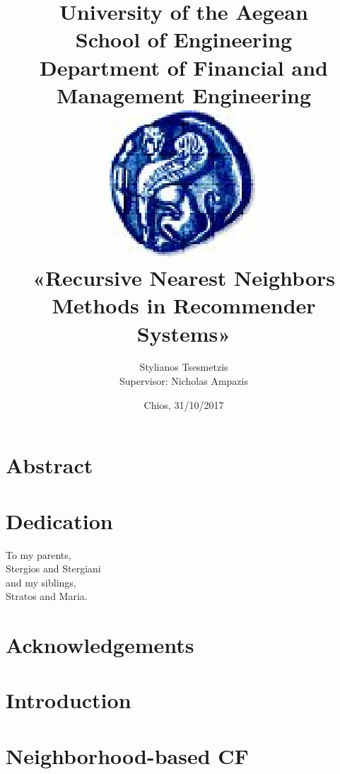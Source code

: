 \documentclass[11pt]{report}
\title{
	{\large
	 University of the Aegean\\
	 School of Engineering\\
	 Department of Financial and Management Engineering}\\
	 \vfill
	{\includegraphics{cover/cover.eps}}\\
	\vfill
	{«Recursive Nearest Neighbors Methods in Recommender Systems»}\\
}
\author{Stylianos Tsesmetzis\\ {\small Supervisor: Nicholas Ampazis}}
\date{{Chios,} 31/10/2017}
\begin{document}
\maketitle
{}

\clearpage

\chapter*{Abstract}


\begin{otherlanguage}{greek}
\chapter*{\abstractname}

\end{otherlanguage}

\chapter*{Dedication}
\begin{center}
	To my parents,\\
	Stergios and Stergiani\\
	and my siblings,\\
	Stratos and Maria.
\end{center}

\chapter*{Acknowledgements}


\tableofcontents{}
\listoffigures
\listoftables
\cleardoublepage{}
\chapter{Introduction}
\label{chap:1}


\chapter{Neighborhood-based CF}
\label{chap:2}

\end{document}
